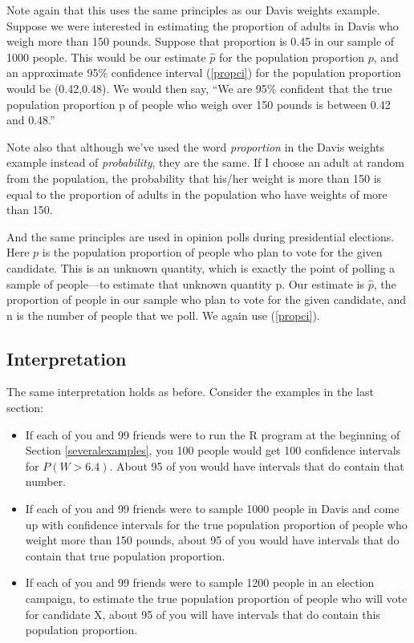 Note again that this uses the same principles as our Davis weights
example.  Suppose we were interested in estimating the proportion of
adults in Davis who weigh more than 150 pounds.  Suppose that proportion
is 0.45 in our sample of 1000 people.  This would be our estimate
$\widehat{p}$ for the population proportion $p$, and an approximate 95\%
confidence interval (\ref{propci}) for the population proportion would be
(0.42,0.48).  We would then say, ``We are 95\% confident that the true
population proportion p of people who weigh over 150 pounds is between
0.42 and 0.48.''

Note also that although we've used the word {\it proportion} in the
Davis weights example instead of {\it probability}, they are the same.
If I choose an adult at random from the population, the probability that
his/her weight is more than 150 is equal to the proportion of adults in
the population who have weights of more than 150.

And the same principles are used in opinion polls during presidential
elections.  Here $p$ is the population proportion of people who plan to
vote for the given candidate.  This is an unknown quantity, which is
exactly the point of polling a sample of people---to estimate that
unknown quantity p.  Our estimate is $\widehat{p}$, the proportion of
people in our sample who plan to vote for the given candidate, and n is
the number of people that we poll.  We again use (\ref{propci}).

\subsection{Interpretation}

The same interpretation holds as before.  Consider the examples in the
last section:

\begin{itemize}

\item If each of you and 99 friends were to run the R program at the
beginning of Section \ref{severalexamples}, you 100 people would get 100
confidence intervals for $P(W > 6.4)$.  About 95 of you would have
intervals that do contain that number.

\item If each of you and 99 friends were to sample 1000 people in Davis
and come up with confidence intervals for the true population proportion
of people who weight more than 150 pounds, about 95 of you would have
intervals that do contain that true population proportion.

\item If each of you and 99 friends were to sample 1200 people in an
election campaign, to estimate the true population proportion of people
who will vote for candidate X, about 95 of you will have intervals that
do contain this population proportion.

\end{itemize}

